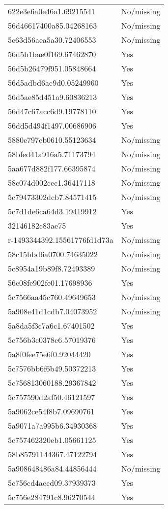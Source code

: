 \begin{tabular}{ll}
622e3e6a0e46a1.69215541 & No/missing \\
56d46617400a85.04268163 & No/missing \\
5e63d56aea5a30.72406553 & No/missing \\
56d5b1bae0f169.67462870 & Yes \\
56d5b26479f951.05848664 & Yes \\
56d5adbd6ac9d0.05249960 & Yes \\
56d5ae85d451a9.60836213 & Yes \\
56d47c67acc6d9.19778110 & Yes \\
56dd5d494f1497.00686906 & Yes \\
5880e797cb0610.55123634 & No/missing \\
58bfed41a916a5.71173794 & No/missing \\
5aa677d882f177.66395874 & No/missing \\
58c074d002cec1.36417118 & No/missing \\
5c79473302dcb7.84571415 & No/missing \\
5c7d1de6ca64d3.19419912 & Yes \\
32146182c83ae75 & Yes \\
r-1493344392.15561776fd1d73a & No/missing \\
58c15bbd6a0700.74635022 & No/missing \\
5c8954a19b89f8.72493389 & No/missing \\
56e08fe902fe01.17698936 & Yes \\
5c7566aa45c760.49649653 & No/missing \\
5a908e41d1cdb7.04073952 & No/missing \\
5a8da5f3c7a6c1.67401502 & Yes \\
5c756b3c0378c6.57019376 & Yes \\
5a8f0fee75e6f0.92044420 & Yes \\
5c7576bb6f6b49.50372213 & Yes \\
5c756813060188.29367842 & Yes \\
5c757590d2af50.46121597 & Yes \\
5a9062ce54f8b7.09690761 & Yes \\
5a9071a7a995b6.34930368 & Yes \\
5c757462320eb1.05661125 & Yes \\
58b85791144367.47122794 & Yes \\
5a908648486a84.44856444 & No/missing \\
5c756cd4aecd09.37939373 & Yes \\
5c756e284791c8.96270544 & Yes \\

\end{tabular}

